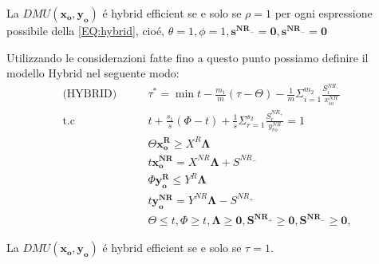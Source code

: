 \begin{definiz}
La $DMU(\boldsymbol{x_{o},y_{o}})$ \'e hybrid efficient se e solo se $\rho = 1$ per ogni espressione possibile della \ref{EQ:hybrid}, cio\'e, $ \theta = 1, \phi = 1, \boldsymbol{s^{NR_{-}} = 0} , \boldsymbol{s^{NR_{-}} = 0}$  
\end{definiz}
\begin{definiz} Utilizzando le considerazioni fatte fino a questo punto possiamo definire il modello Hybrid nel seguente modo:
\begin{equation}
\begin{split}
\text{(HYBRID)} \qquad & \tau^* = \min t - \frac{m_1}{m}(\tau - \Theta) - \frac{1}{m} \Sigma^{m_2}_{i = 1} \frac{S^{NR_{-}}_{i}}{x^{NR}_{io}} \\
\text{t.c} \qquad & t + \frac{s_1}{s}(\Phi - t) + \frac{1}{s} \Sigma^{s_2}_{r = 1} \frac{S^{NR_{+}}_{r}}{y^{NR}_{ro}} = 1 \\
& \Theta\boldsymbol{x^{R}_o} \geq X^R \boldsymbol{\Lambda} \\
& t\boldsymbol{x^{NR}_o} = X^{NR}\boldsymbol{\Lambda} + S^{NR_{-}}\\
& \Phi\boldsymbol{y^{R}_o} \leq Y^R \boldsymbol{\Lambda} \\
& t\boldsymbol{y^{NR}_o} = Y^{NR}\boldsymbol{\Lambda} - S^{NR_{+}}\\
& \Theta \leq t, \Phi \geq t, \boldsymbol{\Lambda \geq 0}, \boldsymbol{S^{NR_{+}} \geq 0}, \boldsymbol{S^{NR_{-}} \geq 0}, 
\end{split}
\end{equation}
\end{definiz}
\begin{teor} La $DMU(\boldsymbol{x_o, y_o})$ \'e hybrid efficient se e solo se $\tau = 1$. 
\end{teor}
